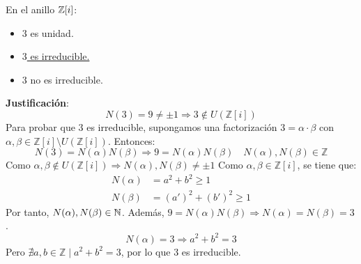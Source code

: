 \begin{ejercicio}
    En el anillo $\mathbb{Z}[i]$:
    \begin{itemize}
        \item $3$ es unidad.
        \item \underline{$3$ es irreducible.}
        \item $3$ no es irreducible.
    \end{itemize}

    \noindent
    \textbf{Justificación}:
    \begin{equation*}
        N(3) = 9 \neq \pm 1 \Longrightarrow 3 \notin U(\mathbb{Z}[i])
    \end{equation*}
    Para probar que $3$ es irreducible, supongamos una factorización $3=\alpha \cdot \beta$ con $\alpha, \beta \in \mathbb{Z}[i]\setminus U(\mathbb{Z}[i])$. Entonces:
    \begin{equation*}
        N(3) = N(\alpha)N(\beta) \Longrightarrow 9 = N(\alpha)N(\beta) \quad N(\alpha), N(\beta) \in \mathbb{Z}
    \end{equation*}
    Como $\alpha, \beta \notin U(\mathbb{Z}[i]) \Longrightarrow N(\alpha), N(\beta)\neq \pm 1$
    Como $\alpha, \beta \in \mathbb{Z}[i]$, se tiene que:
    \begin{align*}
        N(\alpha) &= a^2 + b^2 \geq 1 \\
        N(\beta) &= {(a')}^{2} + {(b')}^{2} \geq 1
    \end{align*}
    Por tanto, $N(\alpha), N(\beta) \in \mathbb{N}$. Además, $9=N(\alpha)N(\beta)\Longrightarrow N(\alpha)=N(\beta)=3$.
    \begin{equation*}
        N(\alpha) = 3 \Longrightarrow a^2 + b^2 = 3
    \end{equation*}
    Pero $\nexists a,b \in \mathbb{Z} \mid a^2 + b^2 = 3$, por lo que 3 es irreducible.
\end{ejercicio}

